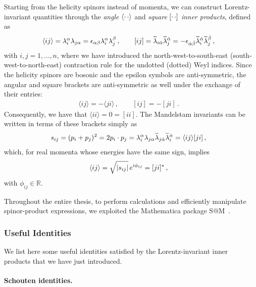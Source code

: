 Starting from the helicity spinors instead of momenta, we can construct Lorentz-invariant quantities through the \textit{angle} $\langle \cdot\, \cdot \rangle$ and \textit{square} $\lbrack \cdot\, \cdot \rbrack$ \textit{inner products}, defined as
\begin{align}
    \langle ij\rangle= \lambda_i^\alpha \lambda_{j\alpha} = \epsilon_{\alpha\beta}\lambda_i^{\alpha}\lambda_j^{\beta} \,,\qquad
    [ij] = \widetilde{\lambda}_{i\dot\alpha}\widetilde{\lambda}_{j}^{\dot\alpha}=-\epsilon_{\dot\alpha\dot\beta}\widetilde{\lambda}_i^{\dot\alpha}\widetilde{\lambda}_j^{\dot\beta}\,,
\end{align}
with $i,j=1,\dotsc,n$, where we have introduced the north-west-to-south-east
(south-west-to-north-east) contraction rule for the undotted (dotted) Weyl indices.
Since the helicity spinors are bosonic and the epsilon symbols are anti-symmetric, the angular and square brackets are anti-symmetric as well under the exchange of their entries:
\begin{align}
    \langle ij \rangle =-\langle ji \rangle \,, \qquad
    [ij] =-[ji] \,.
\end{align}
Consequently, we have that $\langle ii \rangle = 0 = [ii]$.
The Mandelstam invariants can be written in terms of these brackets simply as
\begin{equation}
    s_{ij} = (p_i+p_j)^2 = 2p_i\cdot p_j = \lambda_i^\alpha \lambda_{j\alpha} \widetilde{\lambda}_{j\dot\alpha}\widetilde{\lambda}_{i}^{\dot\alpha} = \langle ij \rangle [ji]\,,
\end{equation}
which, for real momenta whose energies have the same sign, implies
\begin{equation}
    \langle i j \rangle = \sqrt{\abs{s_{ij}}} \,e^{i\phi_{ij}} = \lbrack j i \rbrack^*\,,
\end{equation}
with $\phi_{ij}\in\mathbb R$.

Throughout the entire thesis, to perform calculations and efficiently manipulate spinor-product expressions, we exploited the Mathematica package \textsc{S@M}~\cite{Maitre:2007jq}. 

\subsubsection{Useful Identities}

We list here some useful identities satisfied by the Lorentz-invariant inner products that we have just introduced.

\paragraph{Schouten identities.}

